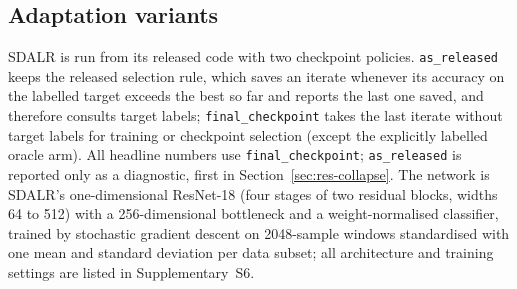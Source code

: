 \subsection{Adaptation variants}

SDALR is run from its released code with two checkpoint policies. \texttt{as\_released} keeps the released selection rule,
which saves an iterate whenever its accuracy on the labelled target exceeds the best so far and reports the last one saved, and therefore consults target labels; \texttt{final\_checkpoint}
takes the last iterate without target labels for training or checkpoint selection (except the explicitly labelled oracle arm). All headline numbers use \texttt{final\_checkpoint};
\texttt{as\_released} is reported only as a diagnostic, first in Section~\ref{sec:res-collapse}. The network is SDALR's one-dimensional \mbox{ResNet-18} (four stages of two residual blocks, widths 64 to 512) with a 256-dimensional bottleneck and a weight-normalised classifier, trained by stochastic gradient descent on 2048-sample windows standardised with one mean and standard deviation per data subset; all architecture and training settings are listed in Supplementary~S6.

